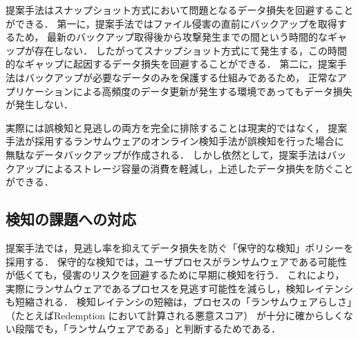 提案手法はスナップショット方式において問題となるデータ損失を回避することができる．
第一に，提案手法ではファイル侵害の直前にバックアップを取得するため，
最新のバックアップ取得後から攻撃発生までの間という時間的なギャップが存在しない．
したがってスナップショット方式にて発生する，この時間的なギャップに起因するデータ損失を回避することができる．
第二に，提案手法はバックアップが必要なデータのみを保護する仕組みであるため，
正常なアプリケーションによる高頻度のデータ更新が発生する環境であってもデータ損失が発生しない．

実際には誤検知と見逃しの両方を完全に排除することは現実的ではなく，
提案手法が採用するランサムウェアのオンライン検知手法が誤検知を行った場合に
無駄なデータバックアップが作成される．
しかし依然として，提案手法はバックアップによるストレージ容量の消費を軽減し，上述したデータ損失を防ぐことができる．

\subsection{検知の課題への対応}
提案手法では，見逃し率を抑えてデータ損失を防ぐ「保守的な検知」ポリシーを採用する．
保守的な検知では，ユーザプロセスがランサムウェアである可能性が低くても，侵害のリスクを回避するために早期に検知を行う．
これにより，実際にランサムウェアであるプロセスを見逃す可能性を減らし，検知レイテンシも短縮される．
検知レイテンシの短縮は，プロセスの「ランサムウェアらしさ」（たとえばRedemption \cite{kharraz2017redemption}において計算される悪意スコア）
が十分に確からしくない段階でも，「ランサムウェアである」と判断するためである．

